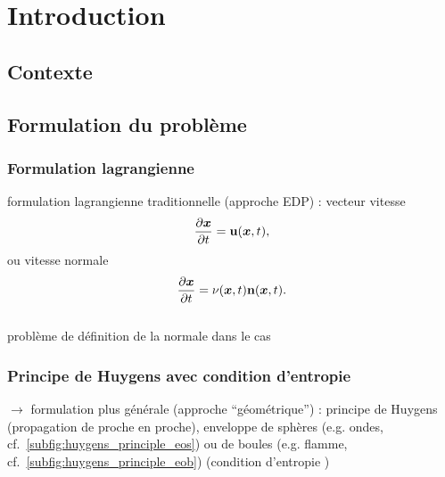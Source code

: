 \def\chapterabstract{}
\chapter{Introduction}

\section{Contexte}%



\section{Formulation du problème}%
\subsection{Formulation lagrangienne}
formulation lagrangienne traditionnelle (approche EDP) : vecteur vitesse 
\begin{equation}
	\frac{\partial \boldsymbol{x}}{\partial t} = \mathbf{u}(\boldsymbol{x},t),
\end{equation}
ou vitesse normale 
\begin{equation}
	\frac{\partial \boldsymbol{x}}{\partial t} = \nu(\boldsymbol{x},t) \mathbf{n}(\boldsymbol{x},t).
\end{equation}
\\
problème de définition de la normale dans le cas \\
\subsection{Principe de Huygens avec condition d'entropie}
$\to$ formulation plus générale (approche ``géométrique'') : principe de Huygens (propagation de proche en proche), enveloppe de sphères (e.g. ondes, cf.~\autoref{subfig:huygens_principle_eos}) ou de boules (e.g. flamme, cf.~\autoref{subfig:huygens_principle_eob}) (condition d'entropie \cite{sethian1999})

